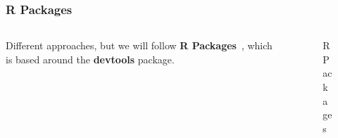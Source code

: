 \documentclass[aspectratio=1610,onlytextwidth]{beamer}
\begin{document}
\begin{frame}[c,fragile]
  \frametitle{R Packages}

  \begin{columns}
    \begin{column}{0.45\textwidth}
      Different approaches, but we will follow \textbf{R Packages}~\parencite{wickhamPackagesOrganizeTest2023},
      which is based around the \textbf{devtools} package.
    \end{column}
    \begin{column}{0.45\textwidth}
      \begin{figure}[htpb]
        \centering
        \caption{%
          R Packages
        }
      \end{figure}%
    \end{column}
  \end{columns}
\end{frame}
\end{document}
